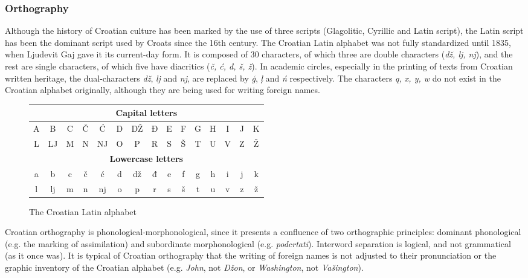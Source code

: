 \begin{multicols}{2}
\subsubsection{Orthography}

Although the history of Croatian culture has been marked by the use of three scripts (Glagolitic, Cyrillic and Latin script), the Latin script has been the dominant script used by Croats since the 16th century. The Croatian Latin alphabet was not fully standardized until 1835, when Ljudevit Gaj gave it its current-day form. It is composed of 30 characters, of which three are double characters (\emph{dž, lj, nj}), and the rest are single characters, of which five have diacritics (\emph{č, ć, đ, š, ž}). In academic circles, especially in the printing of texts from Croatian written heritage, the dual-characters \emph{dž}, \emph{lj} and \emph{nj}, are replaced by \emph{ģ}, \emph{ļ} and \emph{ń} respectively. The characters \emph{q, x, y, w} do not exist in the Croatian alphabet originally, although they are being used for writing foreign names.

\begin{figure*}[htb]
\centering
	\begin{tabular} {|c|c|c|c|c|c|c|c|c|c|c|c|c|c|c|}
        \hline
        \multicolumn{15}{|c|}{\textbf{Capital letters}} \\ \hline
        A & B  & C & Č & Ć  & D & DŽ & Đ & E & F & G & H & I & J & K \\ \hline
        L & LJ & M & N & NJ & O & P  & R & S & Š & T & U & V & Z & Ž \\ \hline
        \multicolumn{15}{|c|}{\textbf{Lowercase letters}} \\ \hline
        a & b  & c & č & ć  & d & dž & đ & e & f & g & h & i & j & k \\ \hline
        l & lj & m & n & nj & o & p  & r & s & š & t & u & v & z & ž \\
        \hline
   \end{tabular}
  \caption{The Croatian Latin alphabet }
  \label{fig:abeceda_en}
\end{figure*}

Croatian orthography is phonological-morphonological, since it presents a confluence of two orthographic principles: dominant phonological (e.g. the marking of assimilation) and subordinate morphonological (e.g. \emph{podcrtati}). Interword separation is logical, and not grammatical (as it once was). It is typical of Croatian orthography that the writing of foreign names is not adjusted to their pronunciation or the graphic inventory of the Croatian alphabet (e.g. \emph{John}, not \emph{Džon}, or \emph{Washington}, not \emph{Vašington}).


\end{multicols}
